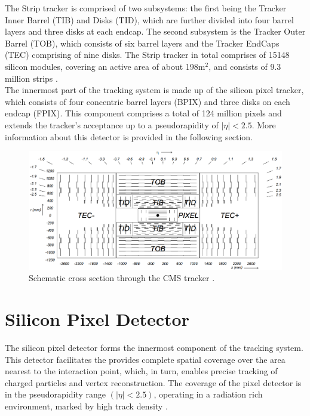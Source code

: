 The Strip tracker is comprised of two subsystems: the first being the Tracker Inner Barrel (TIB) and Disks (TID), which are further divided into four barrel layers and three disks at each endcap. The second subsystem is the Tracker Outer Barrel (TOB), which consists of six barrel layers and the Tracker EndCaps (TEC) comprising of nine disks. The Strip tracker in total comprises of 15148 silicon modules, covering an active area of about 198$\text{m}^{2}$, and consists of 9.3 million strips \cite{CMS_Exp_2008}. \\

The innermost part of the tracking system is made up of the silicon pixel tracker, which consists of four concentric barrel layers (BPIX) and three disks on each endcap (FPIX). This component comprises a total of 124 million pixels and extends the tracker's acceptance up to a pseudorapidity of $|\eta| < 2.5$. More information about this detector is provided in the following section.

\begin{center}
  \begin{figure}[ht]
    \centering
    \includegraphics[scale=.23]{Chapter2/strip_layout.png}
    \caption[Schematic cross section through the CMS tracker]{Schematic cross section through the CMS tracker \cite{CMS_Exp_2008}.}
    \label{strip_layout}
  \end{figure}
\end{center}


\section{Silicon Pixel Detector}

The silicon pixel detector  forms the innermost component of the tracking system. This detector facilitates the provides complete spatial coverage over the area nearest to the interaction point, which, in turn, enables precise tracking of charged particles and vertex reconstruction. The coverage of the pixel detector is in the pseudorapidity range $(|\eta| < 2.5)$, operating in a radiation rich environment, marked by high track density \cite{phase1_Pixel_Detector}.\\

